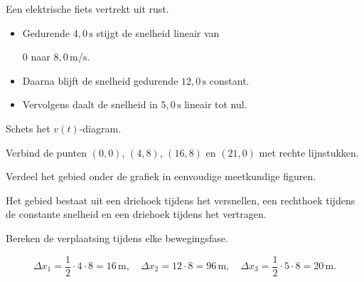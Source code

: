 \documentclass{ximera}
\begin{document}
\begin{oefening}{\oefU\ESS}

Een elektrische fiets vertrekt uit rust.

\begin{itemize}

 \item Gedurende $4,0\,\mathrm{s}$ stijgt de snelheid lineair van

    $0$ naar $8,0\,\mathrm{m/s}$.

 \item Daarna blijft de snelheid gedurende $12,0\,\mathrm{s}$ constant.

 \item Vervolgens daalt de snelheid in $5,0\,\mathrm{s}$ lineair tot nul.

\end{itemize}

\begin{question}

Schets het $v(t)$-diagram.

\begin{oplossing}
Verbind de punten \((0,0)\), \((4,8)\), \((16,8)\) en \((21,0)\) met rechte lijnstukken.
\end{oplossing}

\end{question}

\begin{question}

Verdeel het gebied onder de grafiek in eenvoudige meetkundige figuren.

\begin{oplossing}
Het gebied bestaat uit een driehoek tijdens het versnellen, een rechthoek tijdens de constante snelheid en een driehoek tijdens het vertragen.
\end{oplossing}

\end{question}

\begin{question}

Bereken de verplaatsing tijdens elke bewegingsfase.

\begin{oplossing}
\[\Delta x_1=\frac12\cdot4\cdot8=16\,\mathrm{m}, \quad \Delta x_2=12\cdot8=96\,\mathrm{m}, \quad \Delta x_3=\frac12\cdot5\cdot8=20\,\mathrm{m}.\]
\end{oplossing}

\end{question}


\end{oefening}
\end{document}
